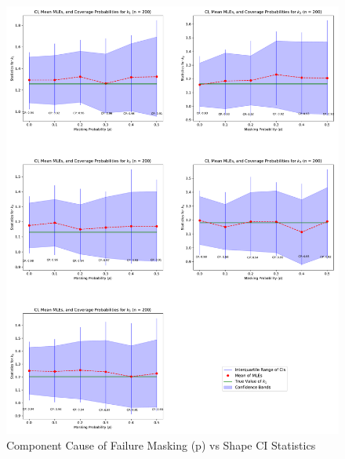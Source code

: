 \documentclass[
]{article}
\begin{document}
\begin{figure}

{\centering \includegraphics{image/plot-p-vs-stats-shape} 

}

\caption{Component Cause of Failure Masking (p) vs Shape CI Statistics}\label{fig:masking-prob-vs-stats-shape}
\end{figure}
\end{document}
